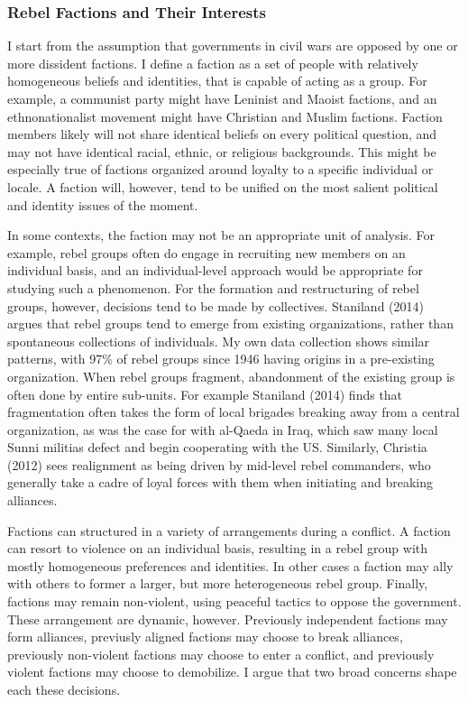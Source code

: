 \documentclass[12pt,]{article}
\begin{document}
\subsubsection{Rebel Factions and Their
Interests}\label{rebel-factions-and-their-interests}

I start from the assumption that governments in civil wars are opposed
by one or more dissident factions. I define a faction as a set of people
with relatively homogeneous beliefs and identities, that is capable of
acting as a group. For example, a communist party might have Leninist
and Maoist factions, and an ethnonationalist movement might have
Christian and Muslim factions. Faction members likely will not share
identical beliefs on every political question, and may not have
identical racial, ethnic, or religious backgrounds. This might be
especially true of factions organized around loyalty to a specific
individual or locale. A faction will, however, tend to be unified on the
most salient political and identity issues of the moment.

In some contexts, the faction may not be an appropriate unit of
analysis. For example, rebel groups often do engage in recruiting new
members on an individual basis, and an individual-level approach would
be appropriate for studying such a phenomenon. For the formation and
restructuring of rebel groups, however, decisions tend to be made by
collectives. Staniland (2014) argues that rebel groups tend to emerge
from existing organizations, rather than spontaneous collections of
individuals. My own data collection shows similar patterns, with 97\% of
rebel groups since 1946 having origins in a pre-existing organization.
When rebel groups fragment, abandonment of the existing group is often
done by entire sub-units. For example Staniland (2014) finds that
fragmentation often takes the form of local brigades breaking away from
a central organization, as was the case for with al-Qaeda in Iraq, which
saw many local Sunni militias defect and begin cooperating with the US.
Similarly, Christia (2012) sees realignment as being driven by mid-level
rebel commanders, who generally take a cadre of loyal forces with them
when initiating and breaking alliances.

Factions can structured in a variety of arrangements during a conflict.
A faction can resort to violence on an individual basis, resulting in a
rebel group with mostly homogeneous preferences and identities. In other
cases a faction may ally with others to former a larger, but more
heterogeneous rebel group. Finally, factions may remain non-violent,
using peaceful tactics to oppose the government. These arrangement are
dynamic, however. Previously independent factions may form alliances,
previusly aligned factions may choose to break alliances, previously
non-violent factions may choose to enter a conflict, and previously
violent factions may choose to demobilize. I argue that two broad
concerns shape each these decisions.
\end{document}
